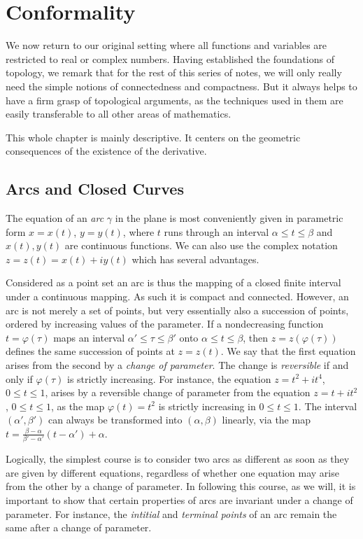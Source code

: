 \chapter{Conformality}

\label{chap:conformality}

We now return to our original setting where all functions and variables are restricted to real or complex numbers. Having established the foundations of topology, we remark that for the rest of this series of notes, we will only really need the simple notions of connectedness and compactness. But it always helps to have a firm grasp of topological arguments, as the techniques used in them are easily transferable to all other areas of mathematics.

This whole chapter is mainly descriptive. It centers on the geometric consequences of the existence of the derivative.

\section{Arcs and Closed Curves}
The equation of an \emph{arc} $\gamma$ in the plane is most conveniently given in parametric form $x=x(t)$, $y=y(t)$, where $t$ runs through an interval $\alpha \le t \le \beta$ and $x(t),y(t)$ are continuous functions. We can also use the complex notation $z=z(t)=x(t)+iy(t)$ which has several advantages.

Considered as a point set an arc is thus the mapping of a closed finite interval under a continuous mapping. As such it is compact and connected. However, an arc is not merely a set of points, but very essentially also a succession of points, ordered by increasing values of the parameter. If a nondecreasing function $t=\varphi(\tau)$ maps an interval $\alpha' \le \tau \le \beta'$ onto $\alpha \le t \le \beta$, then $z=z(\varphi(\tau))$ defines the same succession of points at $z=z(t)$. We say that the first equation arises from the second by a \emph{change of parameter}. The change is \emph{reversible} if and only if $\varphi(\tau)$ is strictly increasing. For instance, the equation $z=t^2+it^4$, $0 \le t \le 1$, arises by a reversible change of parameter from the equation $z=t+it^2$, $0 \le t \le 1$, as the map $\varphi(t)=t^2$ is strictly increasing in $0 \le t \le 1$. The interval $(\alpha',\beta')$ can always be transformed into $(\alpha,\beta)$ linearly, via the map $t=\frac{\beta-\alpha}{\beta'-\alpha'}(t-\alpha')+\alpha$.

Logically, the simplest course is to consider two arcs as different as soon as they are given by different equations, regardless of whether one equation may arise from the other by a change of parameter. In following this course, as we will, it is important to show that certain properties of arcs are invariant under a change of parameter. For instance, the \emph{intitial} and \emph{terminal points} of an arc remain the same after a change of parameter.

